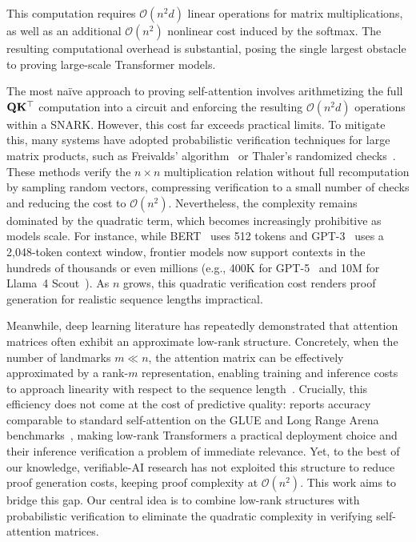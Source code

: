 \documentclass[sigconf,anonymous,review,balance=false]{acmart}
\newcommand{\rev}[1]{{\color{magenta}#1}}
\begin{document}
This computation requires $\mathcal{O}(n^2d)$ linear operations for matrix multiplications, as well as an additional $\mathcal{O}(n^2)$ nonlinear cost induced by the softmax. The resulting computational overhead is substantial, posing the single largest obstacle to proving large-scale Transformer models.

The most na\"ive approach to proving self-attention involves arithmetizing the full ${\mathbf{Q}}{\mathbf{K}}^\top$ computation into a circuit and enforcing the resulting $\mathcal{O}(n^2 d)$ operations within a SNARK. However, this cost far exceeds practical limits. To mitigate this, many systems have adopted probabilistic verification techniques for large matrix products, such as Freivalds' algorithm~\cite{Freivalds} or Thaler's randomized checks~\cite{Thaler}. These methods verify the $n \times n$ multiplication relation without full recomputation by sampling random vectors, compressing verification to a small number of checks and reducing the cost to $\mathcal{O}(n^2)$. Nevertheless, the complexity remains dominated by the quadratic term, which becomes increasingly prohibitive as models scale. For instance, while BERT~\cite{BERT} uses 512 tokens and GPT-3~\cite{GPT3} uses a 2,048-token context window, frontier models now support contexts in the hundreds of thousands or even millions (e.g., 400K for GPT-5~\cite{GPT5} and 10M for Llama~4 Scout~\cite{llama4}). As $n$ grows, this quadratic verification cost renders proof generation for realistic sequence lengths impractical.

Meanwhile, deep learning literature has repeatedly demonstrated that attention matrices often exhibit an approximate low-rank structure. Concretely, when the number of landmarks $m \ll n$, the attention matrix can be effectively approximated by a rank-$m$ representation, enabling training and inference costs to approach linearity with respect to the sequence length~\cite{Linformer, Nystromformer}. \rev{Crucially, this efficiency does not come at the cost of predictive quality: \nystromformer reports accuracy comparable to standard self-attention on the GLUE and Long Range Arena benchmarks~\cite{Nystromformer}, making low-rank Transformers a practical deployment choice and their inference verification a problem of immediate relevance.} \rev{Yet, to the best of our knowledge, verifiable-AI research has not exploited this structure to reduce proof generation costs, keeping proof complexity at $\mathcal{O}(n^2)$.} This work aims to bridge this gap. Our central idea is to combine low-rank structures with probabilistic verification to eliminate the quadratic complexity in verifying self-attention matrices.
\end{document}
